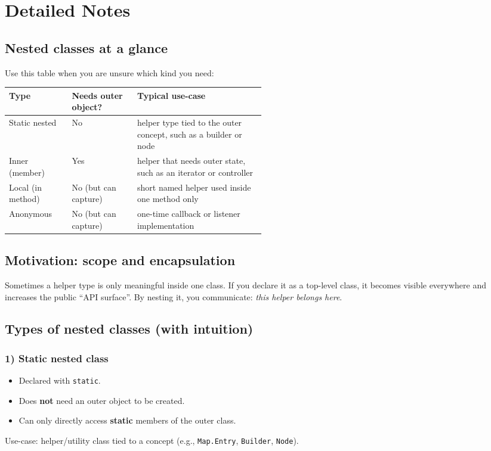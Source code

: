\documentclass[11pt]{article}
\begin{document}
\section{Detailed Notes}
\subsection{Nested classes at a glance}
Use this table when you are unsure which kind you need:

\small
\begin{tabular}{@{}l l p{0.50\linewidth}@{}}
\toprule
\textbf{Type} & \textbf{Needs outer object?} & \textbf{Typical use-case} \\
\midrule
Static nested & No & helper type tied to the outer concept, such as a builder or node \\
Inner (member) & Yes & helper that needs outer state, such as an iterator or controller \\
Local (in method) & No (but can capture) & short named helper used inside one method only \\
Anonymous & No (but can capture) & one-time callback or listener implementation \\
\bottomrule
\end{tabular}
\normalsize

\subsection{Motivation: scope and encapsulation}
Sometimes a helper type is only meaningful inside one class.
If you declare it as a top-level class, it becomes visible everywhere and increases the public ``API surface''.
By nesting it, you communicate: \textit{this helper belongs here}.

\subsection{Types of nested classes (with intuition)}
\subsubsection{1) Static nested class}
\begin{itemize}
  \item Declared with \texttt{static}.
  \item Does \textbf{not} need an outer object to be created.
  \item Can only directly access \textbf{static} members of the outer class.
\end{itemize}
Use-case: helper/utility class tied to a concept (e.g., \texttt{Map.Entry}, \texttt{Builder}, \texttt{Node}).
\end{document}
